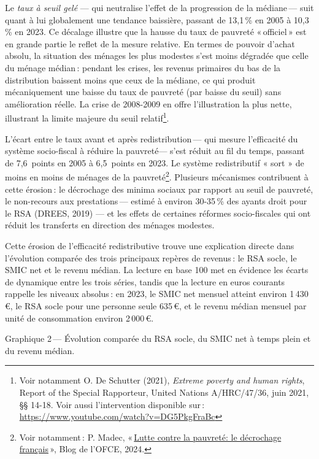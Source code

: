 \documentclass[
  french,
  9pt,
  a4paper,
]{article}
\begin{document}
Le \emph{taux à seuil gelé} --- qui neutralise l'effet de la progression
de la médiane\,--- suit quant à lui globalement une tendance baissière,
passant de 13,1\,\% en 2005 à 10,3\,\% en 2023. Ce décalage illustre que
la hausse du taux de pauvreté «\,officiel\,» est en grande partie le
reflet de la mesure relative. En termes de pouvoir d'achat absolu, la
situation des ménages les plus modestes s'est moins dégradée que celle
du ménage médian\,: pendant les crises, les revenus primaires du bas de
la distribution baissent moins que ceux de la médiane, ce qui produit
mécaniquement une baisse du taux de pauvreté (par baisse du seuil) sans
amélioration réelle. La crise de 2008-2009 en offre l'illustration la
plus nette, illustrant la limite majeure du seuil relatif\footnote{Voir
  notamment O. De Schutter (2021), \emph{Extreme poverty and human
  rights}, Report of the Special Rapporteur, United Nations A/HRC/47/36,
  juin 2021, §§ 14-18. Voir aussi l'intervention disponible sur\,:
  \url{https://www.youtube.com/watch?v=DG5PkgFraBc}}.

L'écart entre le taux avant et après redistribution\,--- qui mesure
l'efficacité du système socio-fiscal à réduire la pauvreté--- s'est
réduit au fil du temps, passant de 7,6~points en 2005 à 6,5~points en
2023. Le système redistributif « sort » de moins en moins de ménages de
la pauvreté\footnote{Voir notamment\,: P. Madec,
  «\,\href{https://www.ofce.sciences-po.fr/blog2024/fr/2025/20251125_PIM/20251125_PIM.fr.pdf}{Lutte
  contre la pauvreté: le décrochage français}\,», Blog de l'OFCE, 2024.}.
Plusieurs mécanismes contribuent à cette érosion\,: le décrochage des
minima sociaux par rapport au seuil de pauvreté, le non-recours aux
prestations\,--- estimé à environ 30-35\,\% des ayants droit pour le RSA
(DREES, 2019) --- et les effets de certaines réformes socio-fiscales qui
ont réduit les transferts en direction des ménages modestes.

Cette érosion de l'efficacité redistributive trouve une explication
directe dans l'évolution comparée des trois principaux repères de
revenus\,: le RSA socle, le SMIC net et le revenu médian. La lecture en
base 100 met en évidence les écarts de dynamique entre les trois séries,
tandis que la lecture en euros courants rappelle les niveaux absolus\,:
en 2023, le SMIC net mensuel atteint environ 1\,430\,€, le RSA socle
pour une personne seule 635\,€, et le revenu médian mensuel par unité de
consommation environ 2\,000\,€.

Graphique 2\,--- Évolution comparée du RSA socle, du SMIC net à temps
plein et du revenu médian.
\end{document}
